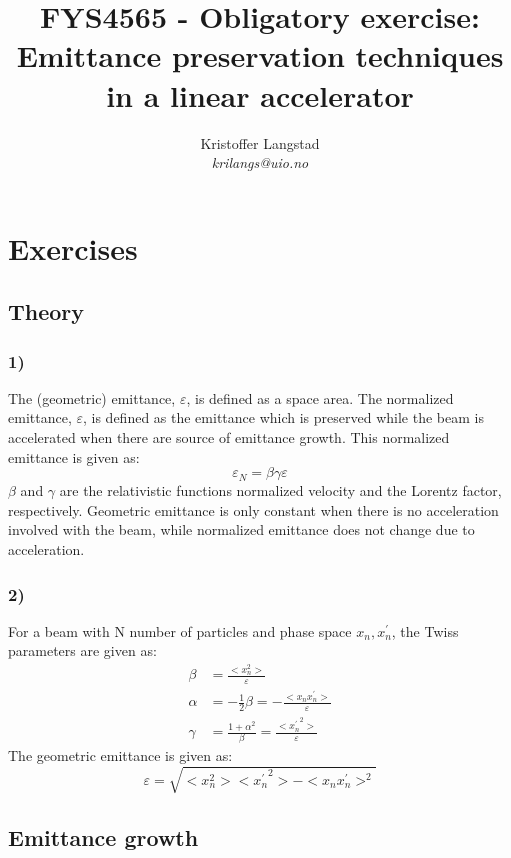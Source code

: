 \documentclass[12pt,a4paper,english]{article}
\title{FYS4565 - Obligatory exercise:\\ Emittance preservation techniques in a linear accelerator}
\date{}
\author{ Kristoffer Langstad\\ \textit{krilangs@uio.no}}
\begin{document}
\maketitle
\section*{Exercises}
\label{sect:Exercises}
\subsection*{Theory}
\label{subsect:Theory}
\subsubsection*{1)}
The (geometric) emittance, $\varepsilon$, is defined as a space area. The normalized emittance, $\varepsilon$, is defined as the emittance which is preserved while the beam is accelerated when there are source of emittance growth. This normalized emittance is given as:
\begin{equation}
\label{eq:norm_em}
\varepsilon_N=\beta\gamma\varepsilon
\end{equation}
$\beta$ and $\gamma$ are the relativistic functions normalized velocity and the Lorentz factor, respectively. Geometric emittance is only constant when there is no acceleration involved with the beam, while normalized emittance does not change due to acceleration.

\subsubsection*{2)}
For a beam with N number of particles and phase space ${x_n,x_n^{\prime}}$, the Twiss parameters are given as:
\begin{align}
\beta &= \frac{<x_n^2>}{\varepsilon}\\
\alpha &= -\frac{1}{2}\beta=-\frac{<x_nx_n^{\prime}>}{\varepsilon}\\
\gamma &= \frac{1+\alpha^2}{\beta}=\frac{<{x_n^{\prime}}^2>}{\varepsilon}
\end{align} 
The geometric emittance is given as:
\begin{equation}
\varepsilon= \sqrt{<x_n^2><{x_n^{\prime}}^2>-<x_nx_n^{\prime}>^2}
\end{equation}

\subsection*{Emittance growth}
\label{subsect:Emittance}
\end{document}
